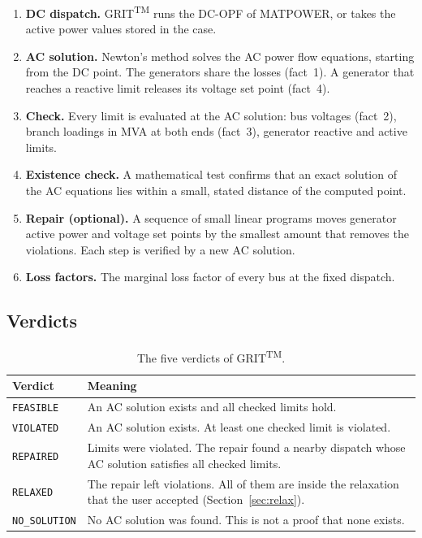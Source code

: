\documentclass[a4paper,11pt]{article}
\newcommand{\TM}{\textsuperscript{TM}}
\newcommand{\GRIT}{GRIT\TM}
\begin{document}
\begin{enumerate}[nosep]
  \item \textbf{DC dispatch.} \GRIT{} runs the DC-OPF of MATPOWER, or takes the active power values stored in the case.
  \item \textbf{AC solution.} Newton's method solves the AC power flow equations, starting from the DC point. The generators share the losses (fact~1). A generator that reaches a reactive limit releases its voltage set point (fact~4).
  \item \textbf{Check.} Every limit is evaluated at the AC solution: bus voltages (fact~2), branch loadings in MVA at both ends (fact~3), generator reactive and active limits.
  \item \textbf{Existence check.} A mathematical test confirms that an exact solution of the AC equations lies within a small, stated distance of the computed point.
  \item \textbf{Repair (optional).} A sequence of small linear programs moves generator active power and voltage set points by the smallest amount that removes the violations. Each step is verified by a new AC solution.
  \item \textbf{Loss factors.} The marginal loss factor of every bus at the fixed dispatch.
\end{enumerate}

\subsection{Verdicts}\label{sec:verdicts}

\begin{table}[H]\centering
\begin{tabular}{@{}lp{11.5cm}@{}}
\toprule
\textbf{Verdict} & \textbf{Meaning} \\
\midrule
\texttt{FEASIBLE} & An AC solution exists and all checked limits hold. \\
\texttt{VIOLATED} & An AC solution exists. At least one checked limit is violated. \\
\texttt{REPAIRED} & Limits were violated. The repair found a nearby dispatch whose AC solution satisfies all checked limits. \\
\texttt{RELAXED} & The repair left violations. All of them are inside the relaxation that the user accepted (Section~\ref{sec:relax}). \\
\texttt{NO\_SOLUTION} & No AC solution was found. This is not a proof that none exists. \\
\bottomrule
\end{tabular}
\caption{The five verdicts of \GRIT.}\label{tab:verdicts}
\end{table}
\end{document}
